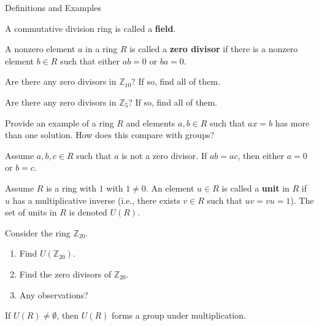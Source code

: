 \begin{section}{Definitions and Examples}
\begin{definition}
A commutative division ring is called a \textbf{field}.
\end{definition}

\begin{definition}
A nonzero element $a$ in a ring $R$ is called a \textbf{zero divisor} if there is a nonzero element $b\in R$ such that either $ab=0$ or $ba=0$.
\end{definition}

\begin{problem}
Are there any zero divisors in $\mathbb{Z}_{10}$?  If so, find all of them.
\end{problem}

\begin{problem}
Are there any zero divisors in $\mathbb{Z}_5$?  If so, find all of them.
\end{problem}

\begin{problem}
Provide an example of a ring $R$ and elements $a,b\in R$ such that $ax=b$ has more than one solution.  How does this compare with groups?
\end{problem}

\begin{theorem}\label{thm:RingCancellation}
Assume $a,b,c\in R$ such that $a$ is not a zero divisor.  If $ab=ac$, then either $a=0$ or $b=c$.
\end{theorem}

\begin{definition}
Assume $R$ is a ring with $1$ with $1\neq 0$. An element $u\in R$ is called a \textbf{unit} in $R$ if $u$ has a multiplicative inverse (i.e., there exists $v\in R$ such that $uv=vu=1$).  The set of units in $R$ is denoted $U(R)$.
\end{definition}

\begin{problem}
Consider the ring $\mathbb{Z}_{20}$.
\begin{enumerate}[label=\rm{(\alph*)}]
\item Find $U(\mathbb{Z}_{20})$.
\item Find the zero divisors of $\mathbb{Z}_{20}$.
\item Any observations?
\end{enumerate}
\end{problem}

\begin{theorem}
If $U(R)\neq\emptyset$, then $U(R)$ forms a group under multiplication.
\end{theorem}


\end{section}
